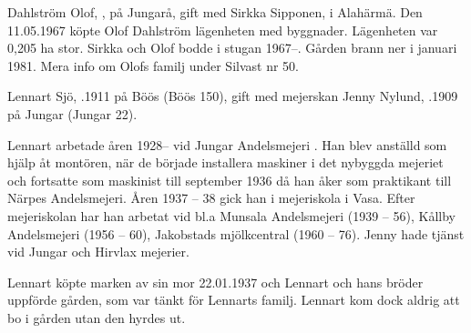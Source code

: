 %
Dahlström Olof, , på Jungarå, gift med Sirkka Sipponen,  i Alahärmä. Den 11.05.1967 köpte Olof Dahlström lägenheten med byggnader. Lägenheten var 0,205 ha stor. Sirkka och Olof bodde i stugan 1967--. Gården brann ner i januari 1981. Mera info om Olofs familj under Silvast nr 50.


%
Lennart Sjö, .1911 på Böös (Böös 150), gift med mejerskan Jenny Nylund, .1909 på Jungar (Jungar 22).
\begin{jhchildren}
  \item {}
  \item {}
\end{jhchildren}
Lennart arbetade åren 1928-- vid Jungar Andelsmejeri . Han blev anställd som hjälp åt montören, när de började installera maskiner i det nybyggda mejeriet och fortsatte som maskinist till september 1936 då han åker som praktikant till Närpes Andelsmejeri. Åren 1937 – 38 			gick han i mejeriskola i Vasa. Efter mejeriskolan har han arbetat vid bl.a Munsala Andelsmejeri (1939 – 56), Kållby Andelsmejeri (1956 – 60), Jakobstads mjölkcentral (1960 – 76). Jenny hade tjänst vid Jungar och Hirvlax mejerier.

Lennart köpte marken av sin mor 22.01.1937 och Lennart och hans bröder uppförde gården, som var tänkt för Lennarts familj. Lennart kom dock aldrig att bo i gården utan den hyrdes ut.

